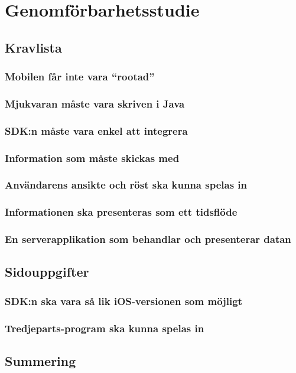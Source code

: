 \section{Genomförbarhetsstudie}
\subsection{Kravlista}
\subsubsection{Mobilen får inte vara ``rootad''}
\subsubsection{Mjukvaran måste vara skriven i Java}
\subsubsection{SDK:n måste vara enkel att integrera}
\subsubsection{Information som måste skickas med}
\subsubsection{Användarens ansikte och röst ska kunna spelas in}
\subsubsection{Informationen ska presenteras som ett tidsflöde}
\subsubsection{En serverapplikation som behandlar och presenterar datan}
\subsection{Sidouppgifter}
\subsubsection{SDK:n ska vara så lik iOS-versionen som möjligt}
\subsubsection{Tredjeparts-program ska kunna spelas in}
\subsection{Summering}
